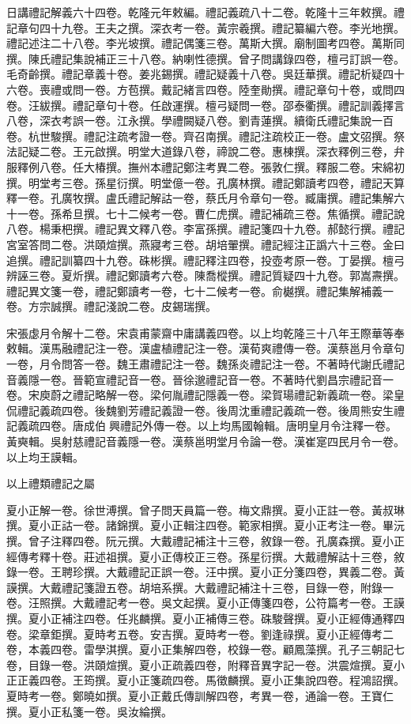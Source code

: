 \begin{pinyinscope}
日講禮記解義六十四卷。乾隆元年敕編。禮記義疏八十二卷。乾隆十三年敕撰。禮記章句四十九卷。王夫之撰。深衣考一卷。黃宗羲撰。禮記纂編六卷。李光地撰。禮記述注二十八卷。李光坡撰。禮記偶箋三卷。萬斯大撰。廟制圖考四卷。萬斯同撰。陳氏禮記集說補正三十八卷。納喇性德撰。曾子問講錄四卷，檀弓訂誤一卷。毛奇齡撰。禮記章義十卷。姜兆錫撰。禮記疑義十八卷。吳廷華撰。禮記析疑四十六卷。喪禮或問一卷。方苞撰。戴記緒言四卷。陸奎勛撰。禮記章句十卷，或問四卷。汪紱撰。禮記章句十卷。任啟運撰。檀弓疑問一卷。邵泰衢撰。禮記訓義擇言八卷，深衣考誤一卷。江永撰。學禮闕疑八卷。劉青蓮撰。續衛氏禮記集說一百卷。杭世駿撰。禮記注疏考證一卷。齊召南撰。禮記注疏校正一卷。盧文弨撰。祭法記疑二卷。王元啟撰。明堂大道錄八卷，禘說二卷。惠棟撰。深衣釋例三卷，弁服釋例八卷。任大椿撰。撫州本禮記鄭注考異二卷。張敦仁撰。釋服二卷。宋綿初撰。明堂考三卷。孫星衍撰。明堂億一卷。孔廣林撰。禮記鄭讀考四卷，禮記天算釋一卷。孔廣牧撰。盧氏禮記解詁一卷，蔡氏月令章句一卷。臧庸撰。禮記集解六十一卷。孫希旦撰。七十二候考一卷。曹仁虎撰。禮記補疏三卷。焦循撰。禮記說八卷。楊秉杷撰。禮記異文釋八卷。李富孫撰。禮記箋四十九卷。郝懿行撰。禮記宮室答問二卷。洪頤煊撰。燕寢考三卷。胡培翬撰。禮記經注正譌六十三卷。金曰追撰。禮記訓纂四十九卷。硃彬撰。禮記釋注四卷，投壺考原一卷。丁晏撰。檀弓辨誣三卷。夏炘撰。禮記鄭讀考六卷。陳喬樅撰。禮記質疑四十九卷。郭嵩燾撰。禮記異文箋一卷，禮記鄭讀考一卷，七十二候考一卷。俞樾撰。禮記集解補義一卷。方宗誠撰。禮記淺說二卷。皮錫瑞撰。

宋張虙月令解十二卷。宋袁甫蒙齋中庸講義四卷。以上均乾隆三十八年王際華等奉敕輯。漢馬融禮記注一卷。漢盧植禮記注一卷。漢荀爽禮傳一卷。漢蔡邕月令章句一卷，月令問答一卷。魏王肅禮記注一卷。魏孫炎禮記注一卷。不著時代謝氏禮記音義隱一卷。晉範宣禮記音一卷。晉徐邈禮記音一卷。不著時代劉昌宗禮記音一卷。宋庾蔚之禮記略解一卷。梁何胤禮記隱義一卷。梁賀瑒禮記新義疏一卷。梁皇侃禮記義疏四卷。後魏劉芳禮記義證一卷。後周沈重禮記義疏一卷。後周熊安生禮記義疏四卷。唐成伯興禮記外傳一卷。以上均馬國翰輯。唐明皇月令注釋一卷。黃奭輯。吳射慈禮記音義隱一卷。漢蔡邕明堂月令論一卷。漢崔寔四民月令一卷。以上均王謨輯。

以上禮類禮記之屬

夏小正解一卷。徐世溥撰。曾子問天員篇一卷。梅文鼎撰。夏小正註一卷。黃叔琳撰。夏小正詁一卷。諸錦撰。夏小正輯注四卷。範家相撰。夏小正考注一卷。畢沅撰。曾子注釋四卷。阮元撰。大戴禮記補注十三卷，敘錄一卷。孔廣森撰。夏小正經傳考釋十卷。莊述祖撰。夏小正傳校正三卷。孫星衍撰。大戴禮解詁十三卷，敘錄一卷。王聘珍撰。大戴禮記正誤一卷。汪中撰。夏小正分箋四卷，異義二卷。黃謨撰。大戴禮記箋證五卷。胡培系撰。大戴禮記補注十三卷，目錄一卷，附錄一卷。汪照撰。大戴禮記考一卷。吳文起撰。夏小正傳箋四卷，公符篇考一卷。王謨撰。夏小正補注四卷。任兆麟撰。夏小正補傳三卷。硃駿聲撰。夏小正經傳通釋四卷。梁章鉅撰。夏時考五卷。安吉撰。夏時考一卷。劉逢祿撰。夏小正經傳考二卷，本義四卷。雷學淇撰。夏小正集解四卷，校錄一卷。顧鳳藻撰。孔子三朝記七卷，目錄一卷。洪頤煊撰。夏小正疏義四卷，附釋音異字記一卷。洪震煊撰。夏小正正義四卷。王筠撰。夏小正箋疏四卷。馬徵麟撰。夏小正集說四卷。程鴻詔撰。夏時考一卷。鄭曉如撰。夏小正戴氏傳訓解四卷，考異一卷，通論一卷。王寶仁撰。夏小正私箋一卷。吳汝綸撰。


\end{pinyinscope}
